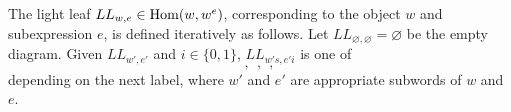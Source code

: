 The light leaf $LL_{w,e} \in \operatorname{Hom}(w, w^e)$, corresponding to the object $w$ and subexpression $e$, is defined iteratively as follows. Let $LL_{\varnothing,\varnothing} = \varnothing$ be the empty diagram. Given $LL_{w',e'}$ and $i \in \{0,1\}$, $LL_{w's,e'i}$ is one of
\begin{equation}
     \:,\:
     \:,\:
     \:,\:
    
\end{equation}
depending on the next label, where $w'$ and $e'$ are appropriate subwords of $w$ and $e$.





